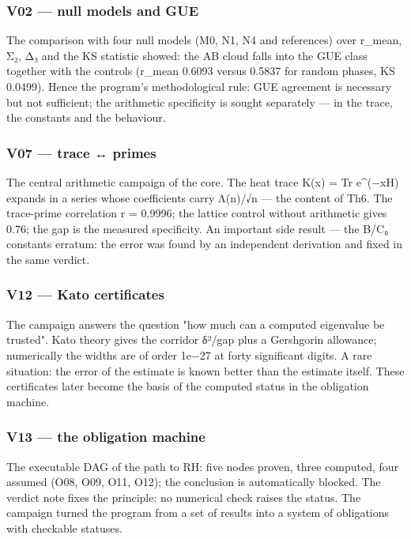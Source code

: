 \documentclass[11pt,a4paper]{article}
\begin{document}
\subsubsection{V02 — null models and GUE}

The comparison with four null models (M0, N1, N4 and references) over r\_mean, Σ₂, Δ₃ and the KS statistic showed: the AB cloud falls into the GUE class together with the controls (r\_mean 0.6093 versus 0.5837 for random phases, KS 0.0499). Hence the program's methodological rule: GUE agreement is necessary but not sufficient; the arithmetic specificity is sought separately — in the trace, the constants and the behaviour.

\subsubsection{V07 — trace ↔ primes}

The central arithmetic campaign of the core. The heat trace K(x) = Tr e\textasciicircum{}(−xH) expands in a series whose coefficients carry Λ(n)/√n — the content of Th6. The trace-prime correlation r = 0.9996; the lattice control without arithmetic gives 0.76; the gap is the measured specificity. An important side result — the B/C₀ constants erratum: the error was found by an independent derivation and fixed in the same verdict.

\subsubsection{V12 — Kato certificates}

The campaign answers the question "how much can a computed eigenvalue be trusted". Kato theory gives the corridor δ²/gap plus a Gershgorin allowance; numerically the widths are of order 1e−27 at forty significant digits. A rare situation: the error of the estimate is known better than the estimate itself. These certificates later become the basis of the computed status in the obligation machine.

\subsubsection{V13 — the obligation machine}

The executable DAG of the path to RH: five nodes proven, three computed, four assumed (O08, O09, O11, O12); the conclusion is automatically blocked. The verdict note fixes the principle: no numerical check raises the status. The campaign turned the program from a set of results into a system of obligations with checkable statuses.
\end{document}
